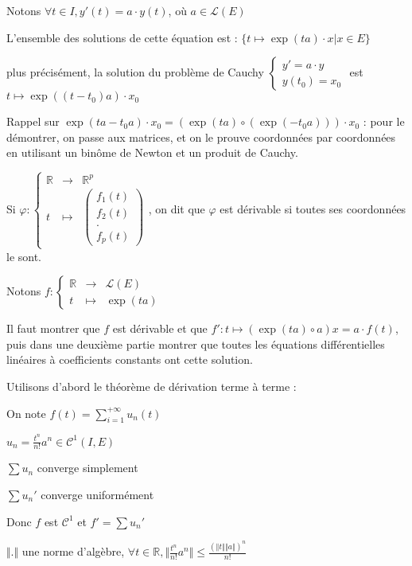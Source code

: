 \documentclass[a4paper,12pt]{book}
\newcommand{\Thr}[2]{\begin{tcolorbox}[sharp corners, colback=white,colframe=red!90!black!75, title=Théorème : #1]#2\end{tcolorbox}}
\newcommand{\Pre}[1]{\begin{tcolorbox}[sharp corners, colback=white,colframe=green!60!green!30!black!75, title=Preuve]#1\end{tcolorbox}}
\def\R{\mathbb{R}}
\begin{document}
\Thr{Résolution de l'équation différentielle linéaire normalisée à coefficients constants}{Notons $\forall t\in I,y'(t) = a\cdot y(t)$, où $a\in\mathcal{L}(E)$
\par L'ensemble des solutions de cette équation est : $\{t\mapsto \exp(t a)\cdot x\vert x\in E\}$
\par plus précisément, la solution du problème de Cauchy $\left\{\begin{array}{l} y' = a\cdot y \\ y(t_0) = x_0\end{array}\right.$ est $t\mapsto \exp((t-t_0)a)\cdot x_0$
}
\Pre{Rappel sur $\exp(ta-t_0a)\cdot x_0 = (\exp(ta)\circ(\exp(-t_0a)))\cdot x_0$ : pour le démontrer, on passe aux matrices, et on le prouve coordonnées par coordonnées en utilisant un binôme de Newton et un produit de Cauchy.
\par Si $\varphi:\left\{\begin{array}{rcl} \R & \to & \R^p \\ t & \mapsto & \begin{pmatrix} f_1(t) \\ f_2(t)\\.\\f_p(t)\end{pmatrix}\end{array}\right.$, on dit que $\varphi$ est dérivable si toutes ses coordonnées le sont.
\par Notons $f:\left\{\begin{array}{rcl}\R & \to & \mathcal{L}(E) \\ t & \mapsto & \exp(ta)\end{array}\right.$
\par Il faut montrer que $f$ est dérivable et que $f':t\mapsto (\exp(ta)\circ a)x = a\cdot f(t)$, puis dans une deuxième partie montrer que toutes les équations différentielles linéaires à coefficients constants ont cette solution.
\par Utilisons d'abord le théorème de dérivation terme à terme :
\par On note $f(t) = \sum\limits_{i=1}^{+\infty}u_n(t)$
\par $u_n = \frac{t^n}{n!}a^n\in\mathcal{C}^1(I, E)$
\par $\sum u_n$ converge simplement
\par $\sum u_n'$ converge uniformément
\par Donc $f$ est $\mathcal{C}^1$ et $f'=\sum u_n'$
\par $\Vert .\Vert$ une norme d'algèbre, $\forall t\in\R, \Vert \frac{t^n}{n!}a^n\Vert \leq \frac{(\Vert t\Vert \Vert a\Vert)^n}{n!}$
}
\end{document}
